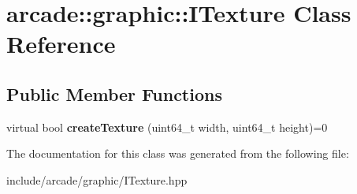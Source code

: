 \hypertarget{classarcade_1_1graphic_1_1_i_texture}{}\section{arcade\+::graphic\+::I\+Texture Class Reference}
\label{classarcade_1_1graphic_1_1_i_texture}
\subsection*{Public Member Functions}
\begin{DoxyCompactItemize}
\item 
\mbox{\label{classarcade_1_1graphic_1_1_i_texture_aea8b20e3832218971934e28eacd3885a}} 
virtual bool {\bfseries create\+Texture} (uint64\+\_\+t width, uint64\+\_\+t height)=0
\end{DoxyCompactItemize}


The documentation for this class was generated from the following file\+:\begin{DoxyCompactItemize}
\item 
include/arcade/graphic/I\+Texture.\+hpp\end{DoxyCompactItemize}
